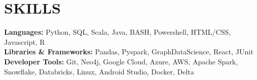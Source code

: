 \documentclass[letterpaper,11pt]{article}
\begin{document}
\section{\textbf{SKILLS}}
    \begin{itemize}[leftmargin=0.05in, label={}]
        \small{\item{
        \textbf{Languages: }{Python, SQL, Scala, Java, BASH, Powershell, HTML/CSS, Javascript, R} \\
        \textbf{Libraries \& Frameworks: }{Pandas, Pyspark, GraphDataScience, React, JUnit} \\
        \textbf{Developer Tools: }{Git, Neo4j, Google Cloud, Azure, AWS, Apache Spark, Snowflake, Databricks, Linux, Android Studio, 
                                  Docker, Delta} \\
        }}
    \end{itemize}


\end{document}
